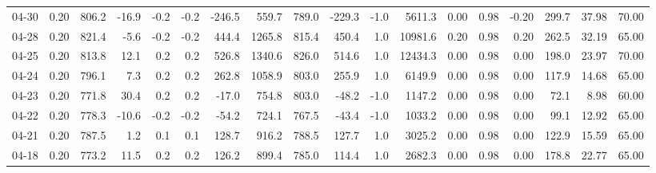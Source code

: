 \begin{threeparttable}
{\begin{tabular}{lrrrrrrrrrrrrrrrrr}
  04-30 &     0.20 & 806.2 &             -16.9 &              -0.2 &               -0.2 &             -246.5 &  559.7 & 789.0 &     -229.3 &                     -1.0 &              5611.3 &       0.00 &      0.98 &          -0.20 &            299.7 &           37.98 &                  70.00 \\
  04-28 &     0.20 & 821.4 &              -5.6 &              -0.2 &               -0.2 &              444.4 & 1265.8 & 815.4 &      450.4 &                      1.0 &             10981.6 &       0.20 &      0.98 &           0.20 &            262.5 &           32.19 &                  65.00 \\
  04-25 &     0.20 & 813.8 &              12.1 &               0.2 &                0.2 &              526.8 & 1340.6 & 826.0 &      514.6 &                      1.0 &             12434.3 &       0.00 &      0.98 &           0.00 &            198.0 &           23.97 &                  70.00 \\
  04-24 &     0.20 & 796.1 &               7.3 &               0.2 &                0.2 &              262.8 & 1058.9 & 803.0 &      255.9 &                      1.0 &              6149.9 &       0.00 &      0.98 &           0.00 &            117.9 &           14.68 &                  65.00 \\
  04-23 &     0.20 & 771.8 &              30.4 &               0.2 &                0.2 &              -17.0 &  754.8 & 803.0 &      -48.2 &                     -1.0 &              1147.2 &       0.00 &      0.98 &           0.00 &             72.1 &            8.98 &                  60.00 \\
  04-22 &     0.20 & 778.3 &             -10.6 &              -0.2 &               -0.2 &              -54.2 &  724.1 & 767.5 &      -43.4 &                     -1.0 &              1033.2 &       0.00 &      0.98 &           0.00 &             99.1 &           12.92 &                  65.00 \\
  04-21 &     0.20 & 787.5 &               1.2 &               0.1 &                0.1 &              128.7 &  916.2 & 788.5 &      127.7 &                      1.0 &              3025.2 &       0.00 &      0.98 &           0.00 &            122.9 &           15.59 &                  65.00 \\
  04-18 &     0.20 & 773.2 &              11.5 &               0.2 &                0.2 &              126.2 &  899.4 & 785.0 &      114.4 &                      1.0 &              2682.3 &       0.00 &      0.98 &           0.00 &            178.8 &           22.77 &                  65.00 \\

\end{tabular}}
\end{threeparttable}
